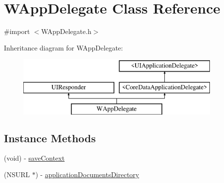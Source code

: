\hypertarget{interface_w_app_delegate}{\section{W\-App\-Delegate Class Reference}
\label{interface_w_app_delegate}
}


{\ttfamily \#import $<$W\-App\-Delegate.\-h$>$}

Inheritance diagram for W\-App\-Delegate\-:\begin{figure}[H]
\begin{center}
\leavevmode
\includegraphics[height=3.000000cm]{interface_w_app_delegate}
\end{center}
\end{figure}
\subsection*{Instance Methods}
\begin{DoxyCompactItemize}
\item 
(void) -\/ \hyperlink{interface_w_app_delegate_ae178edd8502c2e8cb6f281024a17dc97}{save\-Context}
\item 
(N\-S\-U\-R\-L $\ast$) -\/ \hyperlink{interface_w_app_delegate_a0c05de4dfe0707d50343f77ea3283b99}{application\-Documents\-Directory}
\end{DoxyCompactItemize}
